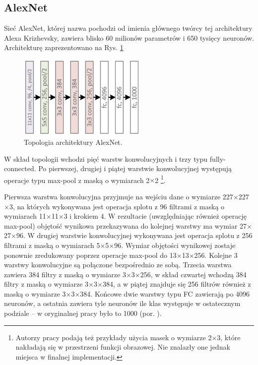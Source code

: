 \subsection{AlexNet}
\label{AlexNet}
Sieć AlexNet, której nazwa pochodzi od imienia głównego twórcy tej architektury Alexa Krizhevsky, zawiera blisko 60 milionów parametrów i 650 tysięcy neuronów. Architekturę zaprezentowano na Rys. \ref{AlexNetTopology}
\begin{figure}[h!]
	\centering
	\includegraphics[width=0.55\textwidth]{figures/AlexNet.png}
	\caption{Topologia architektury AlexNet.}
	\label{AlexNetTopology}
\end{figure}

W skład topologii wchodzi pięć warstw konwolucyjnych i trzy typu fully-connected. Po pierwszej, drugiej i piątej warstwie konwolucyjnej występują operacje typu max-pool z maską o wymiarach 2$\times$2 \footnote{Autorzy pracy podają też przykłady użycia masek o wymiarze 2$\times$3, które nakładają się w przestrzeni funkcji obrazowej. Nie znalazły one jednak miejsca w finalnej implementacji.}. 

Pierwsza warstwa konwolucyjna przyjmuje na wejściu dane o wymiarze 227$\times$227$\times$3, na których wykonywana jest operacja splotu z 96 filtrami z maską o wymiarach 11$\times$11$\times$3 i krokiem 4. W rezultacie (uwzględniając również operację max-pool) objętość wynikowa przekazywana do kolejnej warstwy ma wymiar 27$\times$27$\times$96. W drugiej warstwie konwolucyjnej wykonywana jest operacja splotu z 256 filtrami z maską o wymiarach 5$\times$5$\times$96. Wymiar objętości wynikowej zostaje ponownie zredukowany poprzez operacje max-pool do 13$\times$13$\times$256. Kolejne 3 warstwy konwolucyjne są połączone bezpośrednio ze sobą. Trzecia warstwa zawiera 384 filtry z maską o wymiarze 3$\times$3$\times$256, w skład czwartej wchodzą 384 filtry z maską o wymiarze 3$\times$3$\times$384, a w piątej znajduje się 256 filtrów również z maską o wymiarze 3$\times$3$\times$384. Końcowe dwie warstwy typu FC zawierają po 4096 neuronów, a ostatnia zawiera tyle neuronów ile klas występuje w ostatecznym podziale -- w oryginalnej pracy było to 1000 (por. \cite{Krizhevsky2012}).

